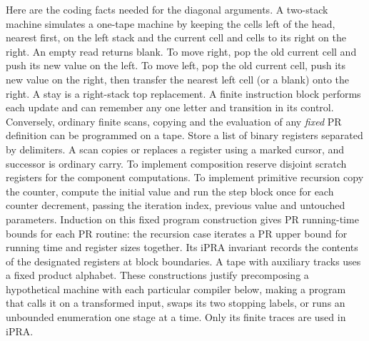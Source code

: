 Here are the coding facts needed for the diagonal arguments. A two-stack machine simulates a one-tape machine by keeping the cells left of the head, nearest first, on the left stack and the current cell and cells to its right on the right. An empty read returns blank. To move right, pop the old current cell and push its new value on the left. To move left, pop the old current cell, push its new value on the right, then transfer the nearest left cell (or a blank) onto the right. A stay is a right-stack top replacement. A finite instruction block performs each update and can remember any one letter and transition in its control. Conversely, ordinary finite scans, copying and the evaluation of any \emph{fixed} PR definition can be programmed on a tape. Store a list of binary registers separated by delimiters. A scan copies or replaces a register using a marked cursor, and successor is ordinary carry. To implement composition reserve disjoint scratch registers for the component computations. To implement primitive recursion copy the counter, compute the initial value and run the step block once for each counter decrement, passing the iteration index, previous value and untouched parameters. Induction on this fixed program construction gives PR running-time bounds for each PR routine: the recursion case iterates a PR upper bound for running time and register sizes together. Its iPRA invariant records the contents of the designated registers at block boundaries. A tape with auxiliary tracks uses a fixed product alphabet. These constructions justify precomposing a hypothetical machine with each particular compiler below, making a program that calls it on a transformed input, swaps its two stopping labels, or runs an unbounded enumeration one stage at a time. Only its finite traces are used in iPRA.

